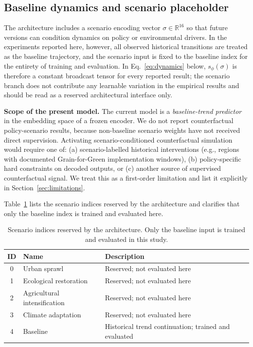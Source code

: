 \documentclass{article}
\begin{document}
\subsection{Baseline dynamics and scenario placeholder}
\label{sec:limitations_scenario}

The architecture includes a scenario encoding vector $\sigma \in \mathbb{R}^{16}$ so that future versions can condition dynamics on policy or environmental drivers. In the experiments reported here, however, all observed historical transitions are treated as the baseline trajectory, and the scenario input is fixed to the baseline index for the entirety of training and evaluation. In Eq.~\ref{eq:dynamics} below, $s_\phi(\sigma)$ is therefore a constant broadcast tensor for every reported result; the scenario branch does not contribute any learnable variation in the empirical results and should be read as a reserved architectural interface only.

\textbf{Scope of the present model.} The current model is a \textit{baseline-trend predictor} in the embedding space of a frozen encoder. We do not report counterfactual policy-scenario results, because non-baseline scenario weights have not received direct supervision. Activating scenario-conditioned counterfactual simulation would require one of: (a) scenario-labelled historical interventions (e.g., regions with documented Grain-for-Green implementation windows), (b) policy-specific hard constraints on decoded outputs, or (c) another source of supervised counterfactual signal. We treat this as a first-order limitation and list it explicitly in Section~\ref{sec:limitations}.

Table~\ref{tab:scenarios} lists the scenario indices reserved by the architecture and clarifies that only the baseline index is trained and evaluated here.

\begin{table}[htbp]
\centering
\caption{Scenario indices reserved by the architecture. Only the baseline input is trained and evaluated in this study.}
\label{tab:scenarios}
\small
\begin{tabular}{clp{}}
\toprule
ID & Name & Description \\
\midrule
0 & Urban sprawl & Reserved; not evaluated here \\
1 & Ecological restoration & Reserved; not evaluated here \\
2 & Agricultural intensification & Reserved; not evaluated here \\
3 & Climate adaptation & Reserved; not evaluated here \\
4 & Baseline & Historical trend continuation; trained and evaluated \\
\bottomrule
\end{tabular}
\end{table}
\end{document}
